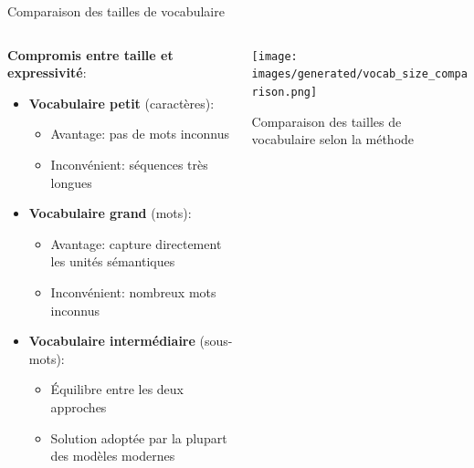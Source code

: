 \documentclass[aspectratio=169,11pt]{beamer}
\begin{document}
\begin{frame}{Comparaison des tailles de vocabulaire}
    \begin{columns}
        \begin{column}{0.5\textwidth}
            \textbf{Compromis entre taille et expressivité}:
            \begin{itemize}
                \item \textbf{Vocabulaire petit} (caractères):
                \begin{itemize}
                    \item Avantage: pas de mots inconnus
                    \item Inconvénient: séquences très longues
                \end{itemize}
                \vspace{0.3cm}
                \item \textbf{Vocabulaire grand} (mots):
                \begin{itemize}
                    \item Avantage: capture directement les unités sémantiques
                    \item Inconvénient: nombreux mots inconnus
                \end{itemize}
                \vspace{0.3cm}
                \item \textbf{Vocabulaire intermédiaire} (sous-mots):
                \begin{itemize}
                    \item Équilibre entre les deux approches
                    \item Solution adoptée par la plupart des modèles modernes
                \end{itemize}
            \end{itemize}
        \end{column}
        \begin{column}{0.5\textwidth}
            \texttt{[image: images/generated/vocab\_size\_comparison.png]}
            \vspace{0.2cm}
            \begin{center}
                \small{Comparaison des tailles de vocabulaire selon la méthode}
            \end{center}
        \end{column}
    \end{columns}
\end{frame}
\end{document}
